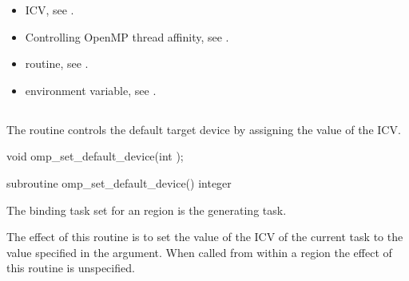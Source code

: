 \crossreferences
\begin{itemize}
\item {} ICV, see 
.

\item Controlling OpenMP thread affinity, see 
. 

\item {} routine, see 
.

\item {} environment variable, see 
.
\end{itemize}





\subsection{}
\label{subsec:omp_set_default_device}

\summary

The  routine controls the default target device by 
assigning the value of the  ICV.

\format
\begin{ccppspecific}
\begin{boxedcode}
void omp\_set\_default\_device(int );
\end{boxedcode}
\end{ccppspecific}

\begin{fortranspecific}
\begin{boxedcode}
subroutine omp\_set\_default\_device()
integer 
\end{boxedcode}
\end{fortranspecific}

\binding
The binding task set for an  region is the generating 
task.

\effect
The effect of this routine is to set the value of the  ICV of the current 
task to the value specified in the argument. When called from within a  region 
the effect of this routine is unspecified.

